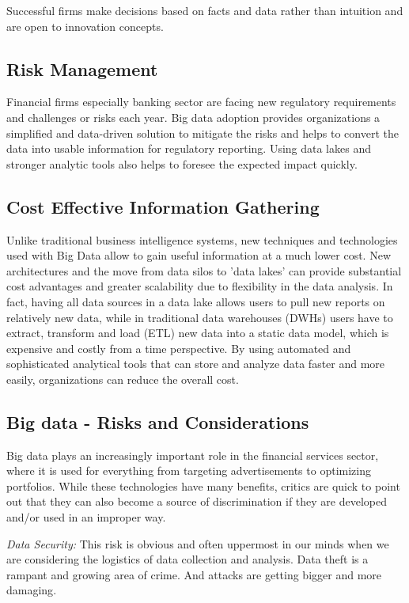 \documentclass[sigconf]{acmart}
\begin{document}
Successful firms make decisions based on facts and data rather than intuition and are open to innovation concepts. 


\subsection{Risk Management}
Financial firms especially banking sector are facing new regulatory requirements and challenges or risks each year. Big data adoption provides organizations a simplified and data-driven solution to mitigate the risks and helps to convert the data into usable information for regulatory reporting. Using data lakes and stronger analytic tools   also helps to foresee the expected impact quickly\cite{the-real-world-use-of-big-data-935}.

\subsection{Cost Effective Information Gathering}

Unlike traditional business intelligence systems, new techniques and technologies used with Big Data allow to gain useful information at a much lower cost. New architectures and the move from data silos to 'data lakes' can provide substantial cost advantages and greater scalability due to flexibility in the data analysis. In fact, having all data sources in a data lake allows users to pull new reports on relatively new data, while in traditional data warehouses (DWHs) users have to extract, transform and load (ETL) new data into a static data model, which is expensive and costly from a time perspective. By using automated and sophisticated analytical tools that can store and analyze data faster and more easily, organizations can reduce the overall cost\cite{accenture-next-generation-financial}.

\subsection{Big data - Risks and Considerations}

Big data plays an increasingly important role in the financial services sector, where it is used for everything from targeting advertisements to optimizing portfolios. While these technologies have many benefits, critics are quick to point out that they can also become a source of discrimination if they are developed and/or used in an improper way\cite{risk-with-bigdata}.

\textit{Data Security:} This risk is obvious and often uppermost in our minds when we are considering the logistics of data collection and analysis. Data theft is a rampant and growing area of crime. And attacks are getting bigger and more damaging\cite{5risks-bigdata}.
\end{document}
